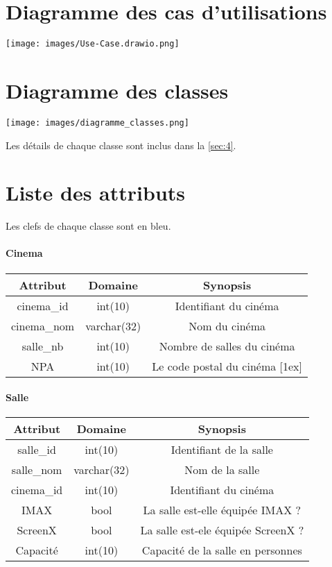 \documentclass[12pt]{article}
\begin{document}
\pagebreak
\section{Diagramme des cas d'utilisations}
\texttt{[image: images/Use-Case.drawio.png]}
\pagebreak
\section{Diagramme des classes}
\begin{center}
    \texttt{[image: images/diagramme\_classes.png]} \\
\end{center}
Les détails de chaque classe sont inclus dans la \autoref{sec:4}.
\pagebreak
\section{Liste des attributs}
Les clefs de chaque classe sont en {\color{blue} bleu}.
\label{sec:4}
\paragraph*{Cinema}
\begin{center}
    \begin{tabular}{||c c c||} 
     \hline
     Attribut & Domaine & Synopsis\\ [0.5ex] 
     \hline\hline
     {\color{blue} cinema{\_}id} & int(10) & Identifiant du cinéma \\ 
     \hline
     cinema{\_}nom & varchar(32) & Nom du cinéma \\
     \hline
     salle{\_}nb & int(10) & Nombre de salles du cinéma\\
     \hline
     NPA & int(10) & Le code postal du cinéma [1ex] \\
     \hline
    \end{tabular}
\end{center}
\paragraph*{Salle}
\begin{center}
    \begin{tabular}{||c c c||} 
     \hline
     Attribut & Domaine & Synopsis\\ [0.5ex] 
     \hline\hline
     {\color{blue} salle{\_}id} & int(10) & Identifiant de la salle \\ 
     \hline
     salle{\_}nom & varchar(32) & Nom de la salle \\
     \hline
     cinema{\_}id & int(10) & Identifiant du cinéma\\
     \hline
     IMAX & bool & La salle est-elle équipée IMAX ? \\
     \hline
     ScreenX & bool & La salle est-ele équipée ScreenX ? \\
     \hline
     Capacité & int(10) & Capacité de la salle en personnes \\
     \hline
    \end{tabular}
\end{center}
\end{document}
